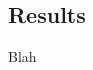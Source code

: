 \documentclass[draft]{article}
\begin{document}
\begin{multicols*}{2}
\section*{Results}
Blah


%
%
%
%
%




\end{multicols*}
\end{document}
